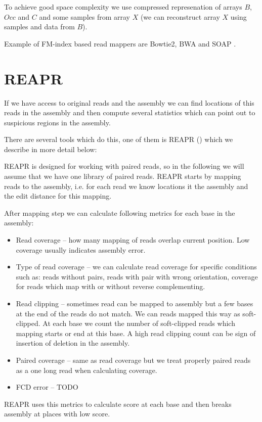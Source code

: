 To achieve good space complexity we use compressed represenation
of arrays $B$, $Occ$ and $C$ and some samples from array $X$ (we can reconstruct
array $X$ using samples and data from $B$).

Example of FM-index based read mappers are Bowtie2, BWA and SOAP
\citep{bowtie2,fmindex,soap}.

\section{REAPR}

If we have access to original reads and the assembly we can find locations
of this reads in the assembly and then compute several statistics which
can point out to suspicious regions in the assembly.

There are several tools which do this, one of them is REAPR (\cite{Reapr}) which we describe
in more detail below:

REAPR is designed for working with paired reads, so in the following we will assume that
we have one library of paired reads. REAPR starts by mapping reads to the assembly, i.e. for each read we know locations it the assembly
and the edit distance for this mapping.

After mapping step we can calculate following metrics for each base in the assembly:
\begin{itemize}
\item Read coverage -- how many mapping of reads overlap current position. Low coverage usually indicates assembly error.
\item Type of read coverage -- we can calculate read coverage for specific conditions such as: reads without pairs, reads with pair with wrong orientation,
coverage for reads which map with or without reverse complementing.
\item Read clipping -- sometimes read can be mapped to assembly but a few bases at the end of the reads do not match. We can reads mapped this way as soft-clipped.
At each base we count the number of soft-clipped reads which mapping starts or end at this base. A high read clipping count can be sign of insertion of deletion
in the assembly.
\item Paired coverage -- same as read coverage but we treat properly paired reads as a one long read when calculating coverage.
\item FCD error -- TODO
\end{itemize}

REAPR uses this metrics to calculate score at each base and then breaks assembly at places with low score.

